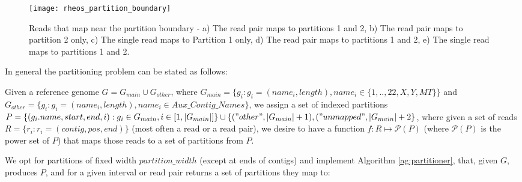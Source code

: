 \begin{figure}[H]
    \texttt{[image: rheos\_partition\_boundary]}
    \centering
    \caption {Reads that map near the partition boundary - a) The read pair maps to partitions 1 and 2, b) The read pair maps to partition 2 only, c) The single read maps to Partition 1 only, d) The read pair maps to partitions 1 and 2, e) The single read maps to partitions 1 and 2.}
    \label{fig:rheos_partition_boundary}
\end{figure}

In general the partitioning problem can be stated as follows:

Given a reference genome $G = G_{main} \cup G_{other}$, where $G_{main} = \{g_i: g_i = (name_i, length), name_i \in \{1,..,22,X,Y,MT\}\}$ and $G_{other} = \{g_i: g_i = (name_i, length), name_i \in Aux\_Contig\_Names\}$, we assign a set of indexed partitions $P = \{(g_i.name, start, end, i) : g_i \in G_{main}, i \in [1,|G_{main}|]\} \cup \{("other",|G_{main}|+1), ("unmapped",|G_{main}|+2\}$, where given a set of reads $R = \{r_i: r_i = (contig, pos, end)\}$ (most often a read or a read pair), we desire to have a function $f:R \mapsto \mathcal{P}(P)$ (where $\mathcal{P}(P)$ is the power set of $P$) that maps those reads to a set of partitions from $P$.

We opt for partitions of fixed width $partition\_width$ (except at ends of contigs) and implement Algorithm \ref{ag:partitioner}, that, given $G$, produces $P$, and for a given interval or read pair returns a set of partitions they map to:

